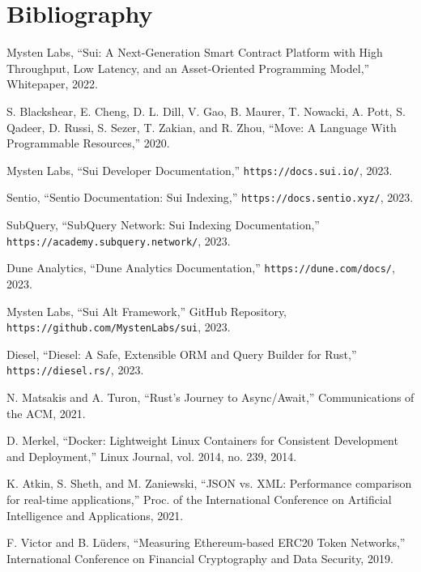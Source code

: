 \section*{Bibliography}

\begin{thebibliography}{99}

Mysten Labs,
``Sui: A Next-Generation Smart Contract Platform with High Throughput, Low Latency, and an Asset-Oriented Programming Model,''
Whitepaper, 2022.

S. Blackshear, E. Cheng, D. L. Dill, V. Gao, B. Maurer, T. Nowacki, A. Pott, S. Qadeer, D. Russi, S. Sezer, T. Zakian, and R. Zhou,
``Move: A Language With Programmable Resources,''
2020.

Mysten Labs,
``Sui Developer Documentation,''
\texttt{https://docs.sui.io/}, 2023.

Sentio,
``Sentio Documentation: Sui Indexing,''
\texttt{https://docs.sentio.xyz/}, 2023.

SubQuery,
``SubQuery Network: Sui Indexing Documentation,''
\texttt{https://academy.subquery.network/}, 2023.

Dune Analytics,
``Dune Analytics Documentation,''
\texttt{https://dune.com/docs/}, 2023.

Mysten Labs,
``Sui Alt Framework,''
GitHub Repository, \texttt{https://github.com/MystenLabs/sui}, 2023.

Diesel,
``Diesel: A Safe, Extensible ORM and Query Builder for Rust,''
\texttt{https://diesel.rs/}, 2023.

N. Matsakis and A. Turon,
``Rust's Journey to Async/Await,''
Communications of the ACM, 2021.

D. Merkel,
``Docker: Lightweight Linux Containers for Consistent Development and Deployment,''
Linux Journal, vol. 2014, no. 239, 2014.

K. Atkin, S. Sheth, and M. Zaniewski,
``JSON vs. XML: Performance comparison for real-time applications,''
Proc. of the International Conference on Artificial Intelligence and Applications, 2021.

F. Victor and B. Lüders,
``Measuring Ethereum-based ERC20 Token Networks,''
International Conference on Financial Cryptography and Data Security, 2019.


\end{thebibliography}
